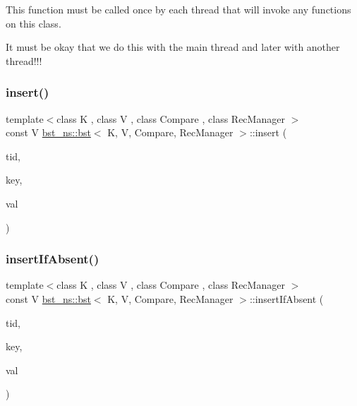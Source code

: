 This function must be called once by each thread that will invoke any functions on this class.

It must be okay that we do this with the main thread and later with another thread!!! \mbox{\label{classbst__ns_1_1bst_a6cd6bfaae7e6100322415e420a06d546}} 
\subsubsection{\texorpdfstring{insert()}{insert()}}
{\footnotesize\ttfamily template$<$class K , class V , class Compare , class Rec\+Manager $>$ \\
const V \hyperlink{classbst__ns_1_1bst}{bst\+\_\+ns\+::bst}$<$ K, V, Compare, Rec\+Manager $>$\+::insert (\begin{DoxyParamCaption}\item[{const int}]{tid,  }\item[{const K \&}]{key,  }\item[{const V \&}]{val }\end{DoxyParamCaption})}

\mbox{\label{classbst__ns_1_1bst_a63851e4152896a4d00f6db93a9527299}} 
\subsubsection{\texorpdfstring{insert\+If\+Absent()}{insertIfAbsent()}}
{\footnotesize\ttfamily template$<$class K , class V , class Compare , class Rec\+Manager $>$ \\
const V \hyperlink{classbst__ns_1_1bst}{bst\+\_\+ns\+::bst}$<$ K, V, Compare, Rec\+Manager $>$\+::insert\+If\+Absent (\begin{DoxyParamCaption}\item[{const int}]{tid,  }\item[{const K \&}]{key,  }\item[{const V \&}]{val }\end{DoxyParamCaption})}

\mbox{\label{classbst__ns_1_1bst_a581f0a73f0567c0b6527f97038715849}} 
